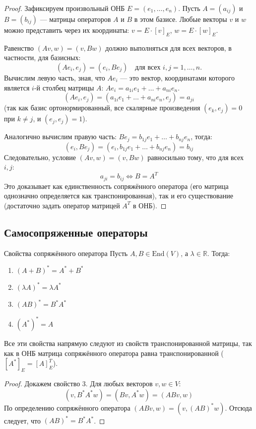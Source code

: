 \begin{proof}
	Зафиксируем произвольный ОНБ $E = (e_1, \dots, e_n)$. Пусть $A = (a_{ij})$ и $B = (b_{ij})$ — матрицы операторов $A$ и $B$ в этом базисе. 
	Любые векторы $v$ и $w$ можно представить через их координаты: $v = E \cdot [v]_E$, $w = E \cdot [w]_E$.
	
	Равенство $(Av, w) = (v, Bw)$ должно выполняться для всех векторов, в частности, для базисных:
	\[
	(Ae_i, e_j) = (e_i, Be_j) \quad \text{для всех } i, j = 1, \dots, n.
	\]
	Вычислим левую часть, зная, что $Ae_i$ — это вектор, координатами которого является $i$-й столбец матрицы $A$: $Ae_i = a_{1i}e_1 + \dots + a_{ni}e_n$.
	\[
	(Ae_i, e_j) = (a_{1i}e_1 + \dots + a_{ni}e_n, e_j) = a_{ji}
	\]
	(так как базис ортонормированный, все скалярные произведения $(e_k, e_j) = 0$ при $k \neq j$, и $(e_j, e_j) = 1$).
	
	Аналогично вычислим правую часть: $Be_j = b_{1j}e_1 + \dots + b_{nj}e_n$, тогда:
	\[
	(e_i, Be_j) = (e_i, b_{1j}e_1 + \dots + b_{nj}e_n) = b_{ij}
	\]
	Следовательно, условие $(Av, w) = (v, Bw)$ равносильно тому, что для всех $i, j$:
	\[
	a_{ji} = b_{ij} \iff B = A^T
	\]
	Это доказывает как единственность сопряжённого оператора (его матрица однозначно определяется как транспонированная), так и его существование (достаточно задать оператор матрицей $A^T$ в ОНБ).
\end{proof}

\subsection{Самосопряженные операторы}

\begin{Statement}{Свойства сопряжённого оператора}{}
	Пусть $A, B \in \mathrm{End}(V)$, а $\lambda \in \mathbb{R}$. Тогда:
	\begin{enumerate}
		\item $(A+B)^* = A^* + B^*$
		\item $(\lambda A)^* = \lambda A^*$
		\item $(AB)^* = B^* A^*$
		\item $(A^*)^* = A$
	\end{enumerate}
	Все эти свойства напрямую следуют из свойств транспонированной матрицы, так как в ОНБ матрица сопряжённого оператора равна транспонированной ($[A^*]_E = [A]_E^T$).
\end{Statement}

\begin{proof}
	Докажем свойство 3. Для любых векторов $v, w \in V$:
	\[
	(v, B^* A^* w) = (Bv, A^* w) = (ABv, w)
	\]
	По определению сопряжённого оператора $(ABv, w) = (v, (AB)^* w)$. Отсюда следует, что $(AB)^* = B^* A^*$.
\end{proof}

